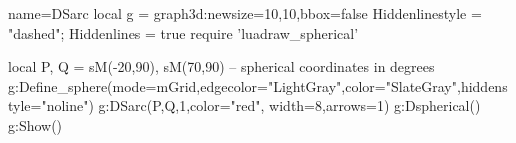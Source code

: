 \documentclass[12pt]{standalone}
\begin{document}
\begin{luadraw}{name=DSarc}
local g = graph3d:new{size={10,10},bbox=false}
Hiddenlinestyle = "dashed"; Hiddenlines = true
require 'luadraw_spherical'

local P, Q = sM(-20,90), sM(70,90) -- spherical coordinates in degrees
g:Define_sphere({mode=mGrid,edgecolor="LightGray",color="SlateGray",hiddenstyle="noline"})
g:DSarc({P,Q},1,{color="red", width=8,arrows=1})
g:Dspherical()
g:Show()
\end{luadraw} 
\end{document}
